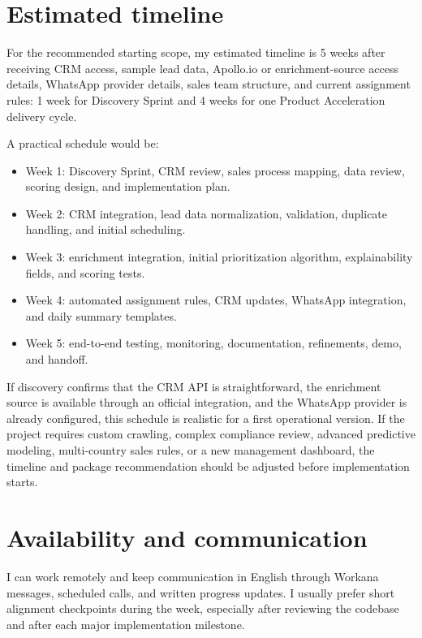 \documentclass[11pt,a4paper]{article}
\begin{document}
\section*{Estimated timeline}

For the recommended starting scope, my estimated timeline is 5 weeks after receiving CRM access, sample lead data, Apollo.io or enrichment-source access details, WhatsApp provider details, sales team structure, and current assignment rules: 1 week for Discovery Sprint and 4 weeks for one Product Acceleration delivery cycle.\par

A practical schedule would be:\par

\begin{itemize}
\item Week 1: Discovery Sprint, CRM review, sales process mapping, data review, scoring design, and implementation plan.
\item Week 2: CRM integration, lead data normalization, validation, duplicate handling, and initial scheduling.
\item Week 3: enrichment integration, initial prioritization algorithm, explainability fields, and scoring tests.
\item Week 4: automated assignment rules, CRM updates, WhatsApp integration, and daily summary templates.
\item Week 5: end-to-end testing, monitoring, documentation, refinements, demo, and handoff.
\end{itemize}

If discovery confirms that the CRM API is straightforward, the enrichment source is available through an official integration, and the WhatsApp provider is already configured, this schedule is realistic for a first operational version. If the project requires custom crawling, complex compliance review, advanced predictive modeling, multi-country sales rules, or a new management dashboard, the timeline and package recommendation should be adjusted before implementation starts.\par

\section*{Availability and communication}

I can work remotely and keep communication in English through Workana messages, scheduled calls, and written progress updates. I usually prefer short alignment checkpoints during the week, especially after reviewing the codebase and after each major implementation milestone.\par
\end{document}
